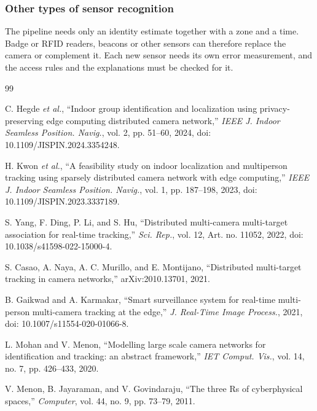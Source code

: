 \documentclass[12pt,a4paper,oneside]{report}
\begin{document}
\subsubsection{Other types of sensor recognition}
The pipeline needs only an identity estimate together with a zone and a time. Badge or RFID readers, beacons or other sensors can therefore replace the camera or complement it. Each new sensor needs its own error measurement, and the access rules and the explanations must be checked for it.

\clearpage
\renewcommand{\bibname}{References}

\begin{thebibliography}{99}
{}

\setlength{\itemsep}{6pt}
\setlength{\parskip}{0pt}

C. Hegde \textit{et al.},
``Indoor group identification and localization using privacy-preserving edge computing distributed camera network,''
\textit{IEEE J. Indoor Seamless Position. Navig.},
vol. 2, pp. 51--60,
2024, doi: 10.1109/JISPIN.2024.3354248.

H. Kwon \textit{et al.},
``A feasibility study on indoor localization and multiperson tracking using sparsely distributed camera network with edge computing,''
\textit{IEEE J. Indoor Seamless Position. Navig.},
vol. 1, pp. 187--198,
2023, doi: 10.1109/JISPIN.2023.3337189.

S. Yang, F. Ding, P. Li, and S. Hu,
``Distributed multi-camera multi-target association for real-time tracking,''
\textit{Sci. Rep.},
vol. 12,
Art. no. 11052, 2022,
doi: 10.1038/s41598-022-15000-4.

S. Casao, A. Naya, A. C. Murillo, and E. Montijano,
``Distributed multi-target tracking in camera networks,''
arXiv:2010.13701, 2021.

B. Gaikwad and A. Karmakar,
``Smart surveillance system for real-time multi-person multi-camera tracking at the edge,''
\textit{J. Real-Time Image Process.},
2021, doi: 10.1007/s11554-020-01066-8.

L. Mohan and V. Menon,
``Modelling large scale camera networks for identification and tracking: an abstract framework,''
\textit{IET Comput. Vis.},
vol. 14, no. 7, pp. 426--433,
2020.

V. Menon, B. Jayaraman, and V. Govindaraju,
``The three Rs of cyberphysical spaces,''
\textit{Computer},
vol. 44, no. 9, pp. 73--79,
2011.


\end{thebibliography}
\end{document}
